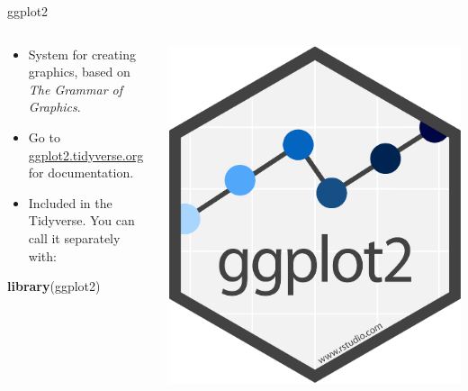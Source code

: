 \documentclass[
  ignorenonframetext,
]{beamer}
\newenvironment{Shaded}{\begin{snugshade}}{\end{snugshade}}
\newcommand{\KeywordTok}[1]{\textcolor[rgb]{0.13,0.29,0.53}{\textbf{#1}}}
\newcommand{\NormalTok}[1]{#1}
\providecommand{\tightlist}{%
  \setlength{\itemsep}{0pt}\setlength{\parskip}{0pt}}
\begin{document}
\begin{frame}[fragile]{ggplot2}
\protect\hypertarget{ggplot2}{}
\begin{columns}[T]
\begin{column}{0.48\textwidth}
\begin{itemize}
\tightlist
\item
  System for creating graphics, based on \emph{The Grammar of Graphics}.
\item
  Go to \href{https://ggplot2.tidyverse.org/}{ggplot2.tidyverse.org} for
  documentation.
\item
  Included in the Tidyverse. You can call it separately with:
\end{itemize}

\begin{Shaded}
\begin{Highlighting}[]
\KeywordTok{library}\NormalTok{(ggplot2)}
\end{Highlighting}
\end{Shaded}
\end{column}

\begin{column}{0.48\textwidth}
\includegraphics{images/ggplot2.png}
\end{column}
\end{columns}
\end{frame}
\end{document}
